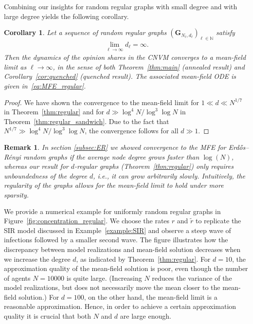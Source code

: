\documentclass[a4paper,
               10pt,
               pdftex,
               normalheadings,
               headsepline,
               footsepline,
               headinclude,
               footinclude,
               DIV=14,
               abstracton]
{scrartcl}
\newtheorem{corollary}[theorem]{Corollary}
\newtheorem{remark}[theorem]{Remark}
\newcommand{\rv}[1]{\bm{#1}}
\newcommand{\review}[1]{{#1}}
\begin{document}
\review{
Combining our insights for random regular graphs with small degree and with large degree yields the following corollary.
\begin{corollary} \label{cor:regular}
    Let a sequence of random regular graphs $(\rv{G}_{N_\ell, d_\ell})_{\ell \in \mathbb{N}}$ satisfy 
    \begin{align}
        \lim_{\ell \to \infty} d_\ell = \infty.
    \end{align}
    Then the dynamics of the opinion shares in the CNVM converges to a mean-field limit as $\ell \to \infty$, in the sense of both Theorem~\ref{thm:main} (annealed result) and Corollary~\ref{cor:quenched} (quenched result). The associated mean-field ODE is given in~\eqref{eq:MFE_regular}.
\end{corollary}
\begin{proof}
     We have shown the convergence to the mean-field limit for $1 \ll d \ll N^{1/7}$ in Theorem~\ref{thm:regular} and for $d \gg \log^4 N / \log^3 \log N$ in Theorem~\ref{thm:regular_sandwich}.
     Due to the fact that $N^{1/7}\gg \log^4 N / \log^3 \log N$, the convergence follows for all $d \gg 1$.
\end{proof}
}

\begin{remark}
    In section \ref{subsec:ER} we showed convergence to the MFE for Erd\H{o}s--Rényi random graphs if the average node degree grows faster than $\log(N)$, whereas our result for $d$-regular graphs (Theorem~\ref{thm:regular}) only requires unboundedness of the degree $d$, i.e., it can grow arbitrarily slowly. Intuitively, the regularity of the graphs allows for the mean-field limit to hold under more sparsity.
\end{remark}

We provide a numerical example for uniformly random regular graphs in Figure~\ref{fig:concentration_regular}.
We choose the rates $r$ and $\tilde{r}$ to replicate the SIR model discussed in Example~\ref{example:SIR} and observe a steep wave of infections followed by a smaller second wave.
The figure illustrates how the discrepancy between model realizations and mean-field solution decreases when we increase the degree $d$, as indicated by Theorem~\ref{thm:regular}.
For $d = 10$, the approximation quality of the mean-field solution is poor, even though the number of agents $N=10000$ is quite large. (Increasing $N$ reduces the variance of the model realizations, but does not necessarily move the mean closer to the mean-field solution.)
For $d = 100$, on the other hand, the mean-field limit is a reasonable approximation.
Hence, in order to achieve a certain approximation quality it is crucial that both $N$ and $d$ are large enough.
\end{document}
